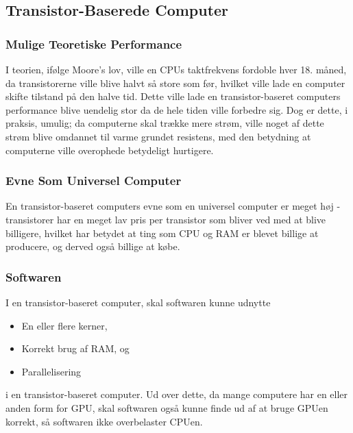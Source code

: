 
\subsection*{Transistor-Baserede Computer}
\subsubsection*{Mulige Teoretiske Performance}
I teorien, ifølge Moore's lov, ville en CPUs taktfrekvens 
fordoble hver 18. måned, da transistorerne ville blive halvt så store 
som før, hvilket ville lade en computer skifte tilstand på den halve 
tid. Dette ville lade en transistor-baseret computers performance 
blive uendelig stor da de hele tiden ville forbedre sig. Dog er dette, 
i praksis, umulig; da computerne skal trække mere strøm, ville noget 
af dette strøm blive omdannet til varme grundet resistens, med den 
betydning at computerne ville overophede betydeligt hurtigere.
\subsubsection*{Evne Som Universel Computer}
En transistor-baseret computers evne som en universel computer er 
meget høj - transistorer har en meget lav pris per transistor som bliver 
ved med at blive billigere, hvilket har betydet at ting som CPU og RAM 
er blevet billige at producere, og derved også billige at købe.
\subsubsection*{Softwaren}
I en transistor-baseret computer, skal softwaren kunne udnytte 
\begin{itemize}
\item En eller flere kerner,
\item Korrekt brug af RAM, og
\item Parallelisering
\end{itemize}
i en transistor-baseret computer. Ud over dette, da mange computere 
har en eller anden form for GPU, skal softwaren også kunne finde ud af 
at bruge GPUen korrekt, så softwaren ikke overbelaster CPUen.

